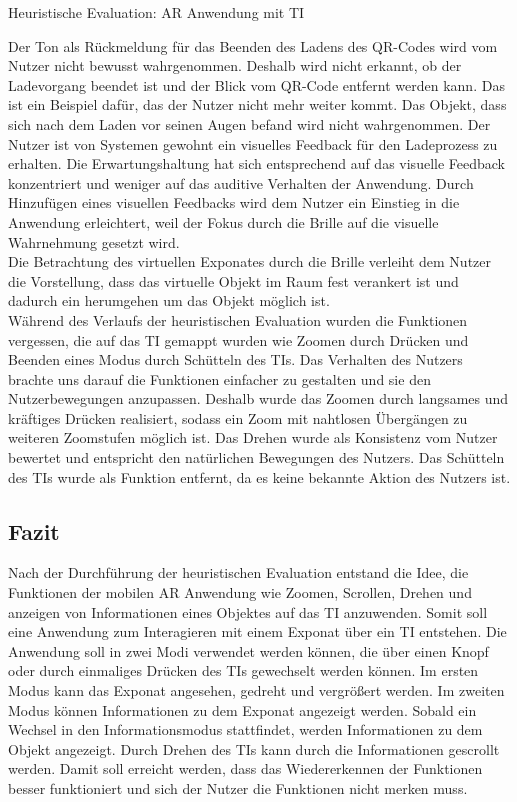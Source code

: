 \documentclass[runningheads,a4paper, 12pt]{llncs}
\begin{document}
\begin{table}[]
\caption{ Heuristische Evaluation: AR Anwendung mit TI}
\label{tab:heur_2}
\end{table}

Der Ton als Rückmeldung für das Beenden des Ladens des QR-Codes wird vom Nutzer nicht bewusst wahrgenommen. Deshalb wird nicht erkannt, ob der Ladevorgang beendet ist und der Blick vom QR-Code entfernt werden kann. Das ist ein Beispiel dafür, das der Nutzer nicht mehr weiter kommt. Das Objekt, dass sich nach dem Laden vor seinen Augen befand wird nicht wahrgenommen. Der Nutzer ist von Systemen gewohnt ein visuelles Feedback für den Ladeprozess zu erhalten. Die Erwartungshaltung hat sich entsprechend auf das visuelle Feedback konzentriert und weniger auf das auditive Verhalten der Anwendung. Durch Hinzufügen eines visuellen Feedbacks wird dem Nutzer ein Einstieg in die Anwendung erleichtert, weil der Fokus durch die Brille auf die visuelle Wahrnehmung gesetzt wird.\\

Die Betrachtung des virtuellen Exponates durch die Brille verleiht dem Nutzer die Vorstellung, dass das virtuelle Objekt im Raum fest verankert ist und dadurch ein herumgehen um das Objekt möglich ist.\\

Während des Verlaufs der heuristischen Evaluation wurden die Funktionen vergessen, die auf das TI gemappt wurden wie Zoomen durch Drücken und Beenden eines Modus durch Schütteln des TIs. Das Verhalten des Nutzers brachte uns darauf die Funktionen einfacher zu gestalten und sie den Nutzerbewegungen anzupassen. Deshalb wurde das Zoomen durch langsames und kräftiges Drücken realisiert, sodass ein Zoom mit nahtlosen Übergängen zu weiteren Zoomstufen möglich ist. Das Drehen wurde als Konsistenz vom Nutzer bewertet und entspricht den natürlichen Bewegungen des Nutzers. Das Schütteln des TIs wurde als Funktion entfernt, da es keine bekannte Aktion des Nutzers ist.\\

\subsection{Fazit}
Nach der Durchführung der heuristischen Evaluation entstand die Idee, die Funktionen  der mobilen AR Anwendung wie Zoomen, Scrollen, Drehen und anzeigen von Informationen eines Objektes auf das TI anzuwenden. Somit soll eine Anwendung zum Interagieren mit einem Exponat über ein TI entstehen. Die Anwendung soll in zwei Modi verwendet werden können, die über einen Knopf oder durch einmaliges Drücken des TIs gewechselt werden können. Im ersten Modus kann das Exponat angesehen, gedreht und vergrößert werden. Im zweiten Modus können Informationen zu dem Exponat angezeigt werden. Sobald ein Wechsel in den Informationsmodus stattfindet, werden Informationen zu dem Objekt angezeigt. Durch Drehen des TIs kann durch die Informationen gescrollt werden. Damit soll erreicht werden, dass das Wiedererkennen der Funktionen besser funktioniert und sich der Nutzer die Funktionen nicht merken muss.\\
\end{document}
